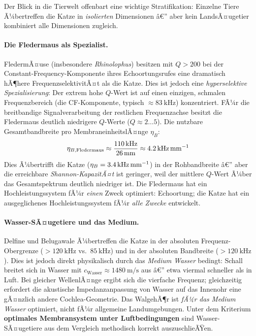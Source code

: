 ﻿\documentclass[12pt,a4paper,titlepage]{report}
\begin{document}
Der Blick in die Tierwelt offenbart eine wichtige Stratifikation: Einzelne Tiere
Ã¼bertreffen die Katze in \emph{isolierten} Dimensionen â€” aber kein LandsÃ¤ugetier
kombiniert alle Dimensionen zugleich.

\paragraph{Die Fledermaus als Spezialist.}
FledermÃ¤use (insbesondere \textit{Rhinolophus}) besitzen mit $Q > 200$ bei
der Constant-Frequency-Komponente ihres Echoortungsrufes eine dramatisch hÃ¶here
FrequenzselektivitÃ¤t als die Katze. Dies ist jedoch eine \emph{hyperselektive
Spezialisierung}: Der extrem hohe $Q$-Wert ist auf einen einzigen, schmalen
Frequenzbereich (die CF-Komponente, typisch $\approx \SI{83}{\kilo\hertz}$)
konzentriert. FÃ¼r die breitbandige Signalverarbeitung der restlichen
Frequenzachse besitzt die Fledermaus deutlich niedrigere $Q$-Werte
($Q \approx 2 \ldots 5$).
Die nutzbare Gesamtbandbreite pro MembraneinheitslÃ¤nge $\eta_B$:
\[
  \eta_{B,\text{Fledermaus}} \approx \frac{\SI{110}{\kilo\hertz}}{\SI{26}{\milli\meter}}
  \approx \SI{4{,}2}{\kilo\hertz\per\milli\meter}
\]
Dies Ã¼bertrifft die Katze ($\eta_B = \SI{3{,}4}{\kilo\hertz\per\milli\meter}$) in der
Rohbandbreite â€” aber die erreichbare \emph{Shannon-KapazitÃ¤t} ist geringer, weil
der mittlere $Q$-Wert Ã¼ber das Gesamtspektrum deutlich niedriger ist.
Die Fledermaus hat ein Hochleistungssystem fÃ¼r \emph{einen} Zweck optimiert:
Echoortung; die Katze hat ein ausgeglichenes Hochleistungssystem fÃ¼r
\emph{alle Zwecke} entwickelt.

\paragraph{Wasser-SÃ¤ugetiere und das Medium.}
Delfine und Belugawale Ã¼bertreffen die Katze in der absoluten Frequenz-Obergrenze
($> \SI{120}{\kilo\hertz}$ vs.\ $\SI{85}{\kilo\hertz}$) und in der absoluten
Bandbreite ($> \SI{120}{\kilo\hertz}$).
Dies ist jedoch direkt physikalisch durch das \emph{Medium Wasser} bedingt:
Schall breitet sich in Wasser mit $c_{\text{Wasser}} \approx \SI{1480}{\meter\per\second}$
aus â€” etwa viermal schneller als in Luft. Bei gleicher WellenlÃ¤nge ergibt sich
die vierfache Frequenz; gleichzeitig erfordert die akustische Impedanzanpassung
von Wasser auf das Innenohr eine gÃ¤nzlich andere Cochlea-Geometrie.
Das WalgehÃ¶r ist \emph{fÃ¼r das Medium Wasser} optimiert, nicht fÃ¼r allgemeine
Landumgebungen.
Unter dem Kriterium \textbf{optimales Membransystem unter Luftbedingungen} sind
Wasser-SÃ¤ugetiere aus dem Vergleich methodisch korrekt auszuschlieÃŸen.
\end{document}
